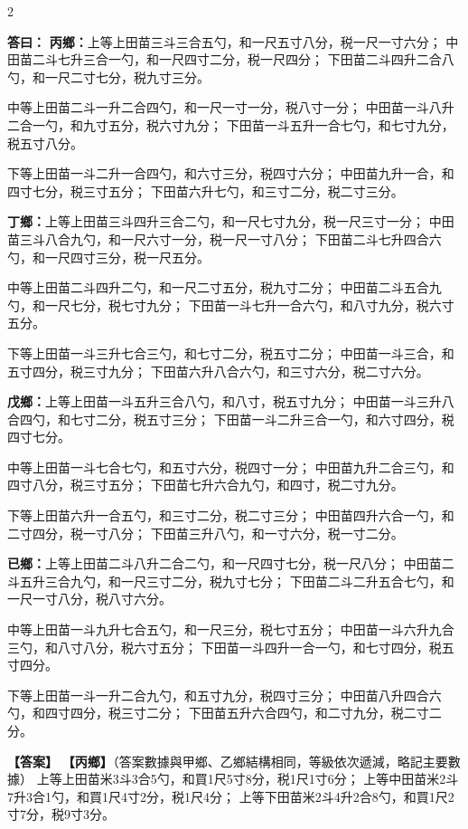 \documentclass[11pt,a4paper]{article}
\newcommand{\ClassicalAnswer}[1]{\par\noindent\textbf{\color{answercolor}答曰：}#1\par}
\newcommand{\ModernAnswer}[1]{\par\noindent\textbf{\color{answercolor}【答案】}#1\par}
\begin{document}
\begin{paracol}{2}

\ClassicalAnswer{%
\textbf{丙鄉：}上等上田苗三斗三合五勺，和一尺五寸八分，税一尺一寸六分；
中田苗二斗七升三合一勺，和一尺四寸二分，税一尺四分；
下田苗二斗四升二合八勺，和一尺二寸七分，税九寸三分。

中等上田苗二斗一升二合四勺，和一尺一寸一分，税八寸一分；
中田苗一斗八升二合一勺，和九寸五分，税六寸九分；
下田苗一斗五升一合七勺，和七寸九分，税五寸八分。

下等上田苗一斗二升一合四勺，和六寸三分，税四寸六分；
中田苗九升一合，和四寸七分，税三寸五分；
下田苗六升七勺，和三寸二分，税二寸三分。

\textbf{丁鄉：}上等上田苗三斗四升三合二勺，和一尺七寸九分，税一尺三寸一分；
中田苗三斗八合九勺，和一尺六寸一分，税一尺一寸八分；
下田苗二斗七升四合六勺，和一尺四寸三分，税一尺五分。

中等上田苗二斗四升二勺，和一尺二寸五分，税九寸二分；
中田苗二斗五合九勺，和一尺七分，税七寸九分；
下田苗一斗七升一合六勺，和八寸九分，税六寸五分。

下等上田苗一斗三升七合三勺，和七寸二分，税五寸二分；
中田苗一斗三合，和五寸四分，税三寸九分；
下田苗六升八合六勺，和三寸六分，税二寸六分。

\textbf{戊鄉：}上等上田苗一斗五升三合八勺，和八寸，税五寸九分；
中田苗一斗三升八合四勺，和七寸二分，税五寸三分；
下田苗一斗二升三合一勺，和六寸四分，税四寸七分。

中等上田苗一斗七合七勺，和五寸六分，税四寸一分；
中田苗九升二合三勺，和四寸八分，税三寸五分；
下田苗七升六合九勺，和四寸，税二寸九分。

下等上田苗六升一合五勺，和三寸二分，税二寸三分；
中田苗四升六合一勺，和二寸四分，税一寸八分；
下田苗三升八勺，和一寸六分，税一寸二分。

\textbf{已鄉：}上等上田苗二斗八升二合二勺，和一尺四寸七分，税一尺八分；
中田苗二斗五升三合九勺，和一尺三寸二分，税九寸七分；
下田苗二斗二升五合七勺，和一尺一寸八分，税八寸六分。

中等上田苗一斗九升七合五勺，和一尺三分，税七寸五分；
中田苗一斗六升九合三勺，和八寸八分，税六寸五分；
下田苗一斗四升一合一勺，和七寸四分，税五寸四分。

下等上田苗一斗一升二合九勺，和五寸九分，税四寸三分；
中田苗八升四合六勺，和四寸四分，税三寸二分；
下田苗五升六合四勺，和二寸九分，税二寸二分。
}

\switchcolumn

\ModernAnswer{%
\textbf{【丙鄉】}（答案數據與甲鄉、乙鄉結構相同，等級依次遞減，略記主要數據）
上等上田苗米3斗3合5勺，和買1尺5寸8分，税1尺1寸6分；
上等中田苗米2斗7升3合1勺，和買1尺4寸2分，税1尺4分；
上等下田苗米2斗4升2合8勺，和買1尺2寸7分，税9寸3分。

}
\end{paracol}
\end{document}
